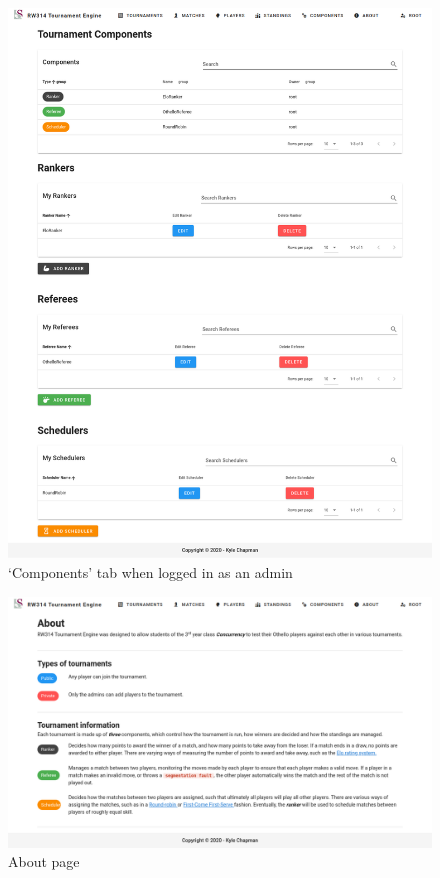 \documentclass[a4paper, 12pt]{report}
\begin{document}
\begin{figure}[H]
	\centering
	\includegraphics[scale=0.35]{components-admin.png}
	\caption{`Components' tab when logged in as an admin}
	\label{fig:components-admin}
\end{figure}
\begin{figure}[H]
	\centering
	\includegraphics[scale=0.37]{about-admin.png}
	\caption{About page}
	\label{fig:about-admin}
\end{figure}
\end{document}
